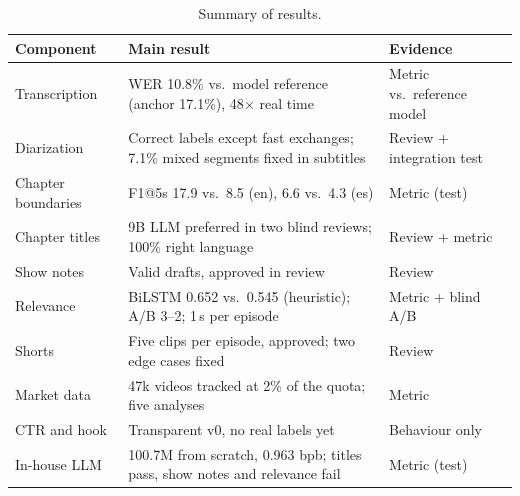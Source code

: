 \begin{table}[H]
\centering
\caption{Summary of results.}
\label{tab:summary}
\small
\begin{tabular}{@{}p{3.2cm}p{7.6cm}p{3.4cm}@{}}
\toprule
\textbf{Component} & \textbf{Main result} & \textbf{Evidence} \\
\midrule
Transcription & WER 10.8\% vs.\ model reference (anchor 17.1\%), 48$\times$ real time & Metric vs.\ reference model \\
Diarization & Correct labels except fast exchanges; 7.1\% mixed segments fixed in subtitles & Review + integration test \\
Chapter boundaries & F1@5s 17.9 vs.\ 8.5 (en), 6.6 vs.\ 4.3 (es) & Metric (test) \\
Chapter titles & 9B LLM preferred in two blind reviews; 100\% right language & Review + metric \\
Show notes & Valid drafts, approved in review & Review \\
Relevance & BiLSTM 0.652 vs.\ 0.545 (heuristic); A/B 3--2; 1\,s per episode & Metric + blind A/B \\
Shorts & Five clips per episode, approved; two edge cases fixed & Review \\
Market data & 47k videos tracked at 2\% of the quota; five analyses & Metric \\
CTR and hook & Transparent v0, no real labels yet & Behaviour only \\
In-house LLM & 100.7M from scratch, 0.963 bpb; titles pass, show notes and relevance fail & Metric (test) \\
\bottomrule
\end{tabular}
\end{table}

